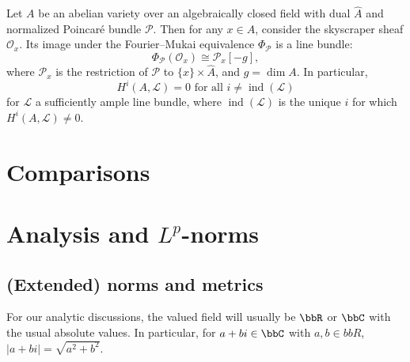 \begin{theorem}
Let $A$ be an abelian variety over an algebraically closed field with dual $\widehat{A}$ and normalized Poincar\'e bundle $\mathcal{P}$. Then for any $x \in A$, consider the skyscraper sheaf $\mathcal{O}_x$. Its image under the Fourier--Mukai equivalence $\Phi_{\mathcal{P}}$ is a line bundle:
$$
\Phi_{\mathcal{P}}(\mathcal{O}_x) \cong \mathcal{P}_x[-g],
$$
where $\mathcal{P}_x$ is the restriction of $\mathcal{P}$ to $\{x\} \times \widehat{A}$, and $g = \dim A$. In particular,
$$
H^i(A, \mathcal{L}) = 0 \text{ for all } i \neq \operatorname{ind}(\mathcal{L})
$$
for $\mathcal{L}$ a sufficiently ample line bundle, where $\operatorname{ind}(\mathcal{L})$ is the unique $i$ for which $H^i(A, \mathcal{L}) \ne 0$.
\end{theorem}




\appendix

\section{Comparisons}



\section{Analysis and \texorpdfstring{$L^p$}{Lp}-norms}


\subsection{(Extended) norms and metrics}

% 


\begin{remark}
    For our analytic discussions, the valued field will usually be $\bbR$ or $\bbC$ with the usual absolute values. In particular, for $a+bi \in \bbC$ with $a,b \in bbR$, $|a+bi| = \sqrt{a^2+b^2}$.
\end{remark}



% 


